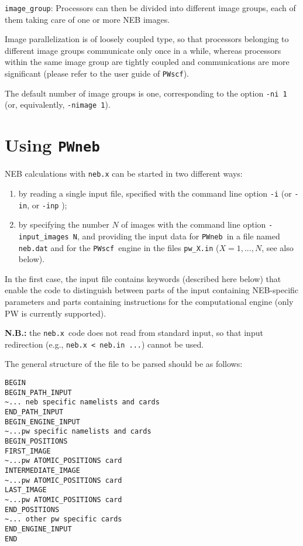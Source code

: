 \documentclass[12pt,a4paper]{article}
\def\NEB{\texttt{PWneb}} %
\def\nebx{\texttt{neb.x}}
\def\PWscf{\texttt{PWscf}}
\begin{document}
\texttt{image\_group}: Processors can then be divided into different image groups,
each of them taking care of one or more NEB images.

Image parallelization is of loosely coupled type, so that processors belonging to
different image groups communicate only once in a while, 
whereas processors within the same image group are tightly coupled and 
communications are more significant (please refer to the user guide of \PWscf).

The default number of image groups is one, corresponding to the option
 \texttt{-ni 1} (or, equivalently,  \texttt{-nimage 1}).

\newpage

\section{Using \NEB}

NEB calculations with \texttt{neb.x} can be started in two different ways:
\begin{enumerate}
\item by reading a single input file, specified with the command line 
option \texttt{-i} (or \texttt{-in}, or \texttt{-inp} );
\item by specifying the number $N$ of images with the command line option 
\texttt{-input\_images N}, and providing the input data for \NEB\ in
a file named \texttt{neb.dat} and for the \PWscf\ engine in the files
 \texttt{pw\_X.in} ($X=1,...,N$, see also below).
\end{enumerate}

In the first case, the input file contains keywords (described here below) 
that enable the code to distinguish between parts of the input containing 
NEB-specific parameters and parts containing instructions for the 
computational engine (only PW is currently supported).

\noindent\textbf{N.B.:} the \nebx\ code does not read from standard input,
so that input redirection (e.g., \texttt{neb.x < neb.in ...}) cannot be used.

The general structure of the file to be parsed should be as follows:
\begin{verbatim}
BEGIN
BEGIN_PATH_INPUT
~... neb specific namelists and cards
END_PATH_INPUT
BEGIN_ENGINE_INPUT
~...pw specific namelists and cards
BEGIN_POSITIONS
FIRST_IMAGE
~...pw ATOMIC_POSITIONS card
INTERMEDIATE_IMAGE
~...pw ATOMIC_POSITIONS card
LAST_IMAGE
~...pw ATOMIC_POSITIONS card
END_POSITIONS
~... other pw specific cards
END_ENGINE_INPUT
END
\end{verbatim}
\end{document}
